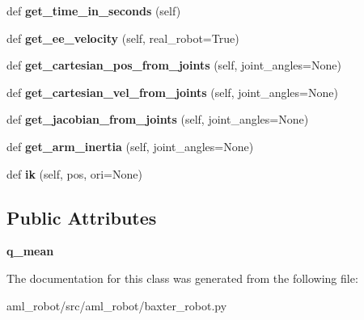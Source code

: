 \begin{DoxyCompactItemize}
\item 
\hypertarget{classaml__robot_1_1baxter__robot_1_1_baxter_arm_a9dcc207d5f7703f7f9f69bb54c1ee7b3}{}\label{classaml__robot_1_1baxter__robot_1_1_baxter_arm_a9dcc207d5f7703f7f9f69bb54c1ee7b3} 
def {\bfseries get\+\_\+time\+\_\+in\+\_\+seconds} (self)
\item 
\hypertarget{classaml__robot_1_1baxter__robot_1_1_baxter_arm_a411092f179a7420d38625063c27b237e}{}\label{classaml__robot_1_1baxter__robot_1_1_baxter_arm_a411092f179a7420d38625063c27b237e} 
def {\bfseries get\+\_\+ee\+\_\+velocity} (self, real\+\_\+robot=True)
\item 
\hypertarget{classaml__robot_1_1baxter__robot_1_1_baxter_arm_a9ce9c74c445092b5f9bd26793366c8de}{}\label{classaml__robot_1_1baxter__robot_1_1_baxter_arm_a9ce9c74c445092b5f9bd26793366c8de} 
def {\bfseries get\+\_\+cartesian\+\_\+pos\+\_\+from\+\_\+joints} (self, joint\+\_\+angles=None)
\item 
\hypertarget{classaml__robot_1_1baxter__robot_1_1_baxter_arm_a5d42a91ca13fc1776997909afb999d8f}{}\label{classaml__robot_1_1baxter__robot_1_1_baxter_arm_a5d42a91ca13fc1776997909afb999d8f} 
def {\bfseries get\+\_\+cartesian\+\_\+vel\+\_\+from\+\_\+joints} (self, joint\+\_\+angles=None)
\item 
\hypertarget{classaml__robot_1_1baxter__robot_1_1_baxter_arm_a05c9ee1fe630edbcdc34249bb0c613b3}{}\label{classaml__robot_1_1baxter__robot_1_1_baxter_arm_a05c9ee1fe630edbcdc34249bb0c613b3} 
def {\bfseries get\+\_\+jacobian\+\_\+from\+\_\+joints} (self, joint\+\_\+angles=None)
\item 
\hypertarget{classaml__robot_1_1baxter__robot_1_1_baxter_arm_ae3980ca9408490d07b4460e6d7fc2eb2}{}\label{classaml__robot_1_1baxter__robot_1_1_baxter_arm_ae3980ca9408490d07b4460e6d7fc2eb2} 
def {\bfseries get\+\_\+arm\+\_\+inertia} (self, joint\+\_\+angles=None)
\item 
\hypertarget{classaml__robot_1_1baxter__robot_1_1_baxter_arm_a5ce4a9920b76e223e375755faaef7cf5}{}\label{classaml__robot_1_1baxter__robot_1_1_baxter_arm_a5ce4a9920b76e223e375755faaef7cf5} 
def {\bfseries ik} (self, pos, ori=None)
\end{DoxyCompactItemize}
\subsection*{Public Attributes}
\begin{DoxyCompactItemize}
\item 
\hypertarget{classaml__robot_1_1baxter__robot_1_1_baxter_arm_adf4365cfefdb2632a538a3f225023aa7}{}\label{classaml__robot_1_1baxter__robot_1_1_baxter_arm_adf4365cfefdb2632a538a3f225023aa7} 
{\bfseries q\+\_\+mean}
\end{DoxyCompactItemize}


The documentation for this class was generated from the following file\+:\begin{DoxyCompactItemize}
\item 
aml\+\_\+robot/src/aml\+\_\+robot/baxter\+\_\+robot.\+py\end{DoxyCompactItemize}
